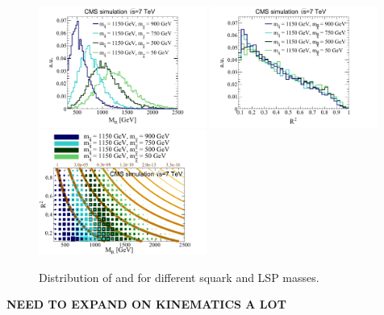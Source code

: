 \begin{figure}[thb!]
\centering
\includegraphics[width=0.49\textwidth]{figs/theory/MR_T2_pheno.pdf}
\includegraphics[width=0.49\textwidth]{figs/theory/RSQ_T2_pheno.pdf}\\
\includegraphics[width=0.49\textwidth]{figs/theory/MR_T2_R2_pheno.pdf}
\caption{Distribution of \Rtwo and \MR for different squark and LSP masses.\label{fig:T2RsqMR}}
\end{figure}

\textbf{NEED TO EXPAND ON KINEMATICS A LOT}

